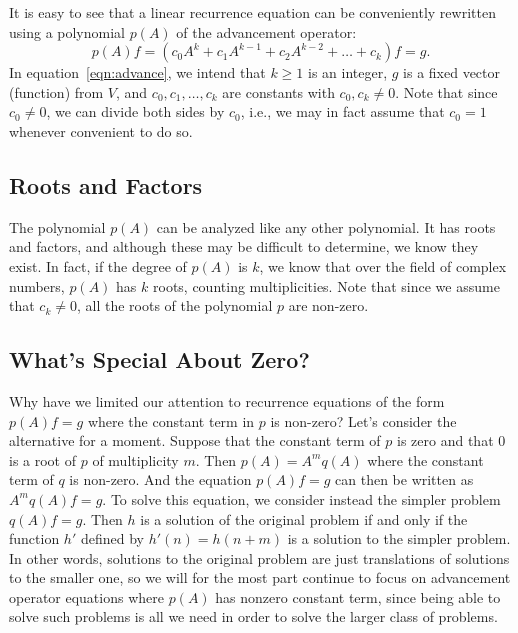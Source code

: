 It is easy to see that a linear recurrence equation can be
conveniently rewritten using a polynomial $p(A)$ of the 
advancement operator:
\begin{equation}\label{eqn:advance}
p(A)f=(c_0A^{k}+ c_1A^{k-1} + c_2A^{k-2} + \dots+c_k)f = g.
\end{equation} 
In equation~\ref{eqn:advance}, we intend that $k\ge1$ is an integer,
$g$ is a fixed vector (function) from $V$, and $c_0,c_1,\dots,
c_k$ are constants with $c_0,c_k\neq0$.  Note that since $c_0\neq0$,
we can divide both sides by $c_0$, i.e., we may in fact assume
that $c_0=1$ whenever convenient to do so.

\subsection{Roots and Factors}\label{s:recurrence:adv-ops:roots-factors}

The polynomial $p(A)$ can be analyzed like any other polynomial.
It has roots and factors, and although these may be difficult to
determine, we know they exist.  In fact, if the degree of $p(A)$ 
is $k$, we know that over the field of complex numbers, $p(A)$
has $k$ roots, counting multiplicities.  Note that since we assume
that $c_k\neq0$, all the roots of the polynomial $p$ are non-zero.

\subsection{What's Special About Zero?}\label{s:recurrence:adv-ops:zero}

Why have we limited our attention to recurrence equations of the form
$p(A)f = g$ where the constant term in $p$ is non-zero?  Let's
consider the alternative for a moment.  Suppose that the constant term
of $p$ is zero and that $0$ is a root of $p$ of multiplicity $m$.
Then $p(A) = A^mq(A)$ where the constant term of $q$ is non-zero.  And
the equation $p(A)f=g$ can then be written as $A^mq(A)f=g$.  To solve
this equation, we consider instead the simpler problem $q(A)f=g$.
Then $h$ is a solution of the original problem if and only if the
function $h'$ defined by $h'(n) = h(n+m)$ is a solution to the simpler
problem.  In other words, solutions to the original problem are just
translations of solutions to the smaller one, so we will for the most
part continue to focus on advancement operator equations where $p(A)$
has nonzero constant term, since being able to solve such problems is
all we need in order to solve the larger class of problems.

